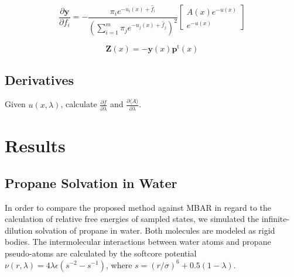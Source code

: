 \documentclass[aip,jcp,reprint,amsmath,amssymb]{revtex4-1}
\newcommand{\mt}[1]{\boldsymbol{\mathbf{#1}}}           %
\newcommand{\vt}[1]{\boldsymbol{\mathbf{#1}}}           %
\newcommand{\tr}[1]{#1^\text{t}}                        %
\begin{document}
\begin{equation}
\frac{\partial \vt y}{\partial f_i} = -\frac{\pi_i e^{-u_i(x) + \hat f_i}}{\left(\sum_{i=1}^m \pi_j e^{-u_j(x) + \hat f_j}\right)^2} \left[\begin{array}{c} A(x)e^{-u(x)} \\ e^{-u(x)} \end{array}\right]
\end{equation}

\begin{equation}
\mt Z(x) = -{\vt y(x)}\tr{\vt p}(x)
\end{equation}

\subsection{Derivatives}

Given $u(x,\lambda)$, calculate $\frac{\partial f}{\partial \lambda}$ and $\frac{\partial \langle A \rangle}{\partial \lambda}$.

\section{Results}

\subsection{Propane Solvation in Water}

In order to compare the proposed method against MBAR in regard to the calculation of relative free energies of sampled states, we simulated the infinite-dilution solvation of propane in water. Both molecules are modeled as rigid bodies. The intermolecular interactions between water atoms and propane pseudo-atoms are calculated by the softcore potential\cite{Beutler_1994} $\nu(r,\lambda) = 4\lambda\epsilon(s^{-2} - s^{-1})$, where $s = (r/\sigma)^6 + 0.5 (1-\lambda)$.
\end{document}
